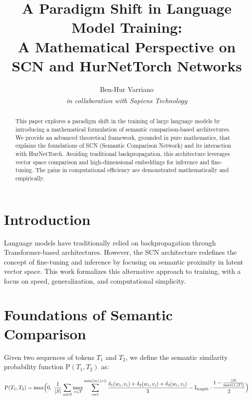 \documentclass[11pt]{article}
\title{A Paradigm Shift in Language Model Training: \\
A Mathematical Perspective on SCN and HurNetTorch Networks}
\author{Ben-Hur Varriano\\\textit{in collaboration with Sapiens Technology\textsuperscript{\textregistered}}}
\date{}
\begin{document}
\maketitle

\begin{abstract}
This paper explores a paradigm shift in the training of large language models by introducing a mathematical formulation of semantic comparison-based architectures. We provide an advanced theoretical framework, grounded in pure mathematics, that explains the foundations of SCN (Semantic Comparison Network) and its interaction with HurNetTorch. Avoiding traditional backpropagation, this architecture leverages vector space comparison and high-dimensional embeddings for inference and fine-tuning. The gains in computational efficiency are demonstrated mathematically and empirically.
\end{abstract}

\newpage
\tableofcontents

\newpage

\section{Introduction}
Language models have traditionally relied on backpropagation through Transformer-based architectures. However, the SCN architecture redefines the concept of fine-tuning and inference by focusing on semantic proximity in latent vector space. This work formalizes this alternative approach to training, with a focus on speed, generalization, and computational simplicity.

\section{Foundations of Semantic Comparison}
Given two sequences of tokens $T_1$ and $T_2$, we define the semantic similarity probability function $\text{P}(T_1, T_2)$ as:

\begin{equation}
\label{eq:probability_function}
\begin{aligned}
\text{P}(T_1, T_2) = \max\Bigl(0,\;
\frac{1}{|S|} \sum_{w \in S} \max_{v \in T}
\sum_{i=1}^{\min(|w|, |v|)} \frac{
\delta_1(w_i, v_i) + \delta_2(w_i, v_i) + \delta_3(w_i, v_i)
}{3}
- \mathbb{I}_{\text{length}} \cdot \frac{1 - \frac{|S|}{\max(1, |T|)}}{2}
\Bigr)
\end{aligned}
\end{equation}
\end{document}
